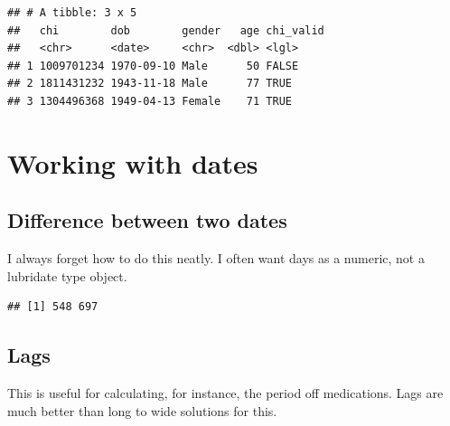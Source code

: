 \documentclass[
]{book}
\newenvironment{Shaded}{\begin{snugshade}}{\end{snugshade}}
\newcommand{\KeywordTok}[1]{\textcolor[rgb]{0.13,0.29,0.53}{\textbf{#1}}}
\newcommand{\NormalTok}[1]{#1}
\newcommand{\OperatorTok}[1]{\textcolor[rgb]{0.81,0.36,0.00}{\textbf{#1}}}
\newcommand{\StringTok}[1]{\textcolor[rgb]{0.31,0.60,0.02}{#1}}
\begin{document}
\begin{verbatim}
## # A tibble: 3 x 5
##   chi        dob        gender   age chi_valid
##   <chr>      <date>     <chr>  <dbl> <lgl>    
## 1 1009701234 1970-09-10 Male      50 FALSE    
## 2 1811431232 1943-11-18 Male      77 TRUE     
## 3 1304496368 1949-04-13 Female    71 TRUE
\end{verbatim}

\hypertarget{working-with-dates}{%
\section{Working with dates}\label{working-with-dates}}

\hypertarget{difference-between-two-dates}{%
\subsection{Difference between two dates}\label{difference-between-two-dates}}

I always forget how to do this neatly.
I often want days as a numeric, not a lubridate type object.

\begin{Shaded}
\end{Shaded}

\begin{verbatim}
## [1] 548 697
\end{verbatim}

\hypertarget{lags}{%
\subsection{Lags}\label{lags}}

This is useful for calculating, for instance, the period off medications. Lags are much better than long to wide solutions for this.
\end{document}
